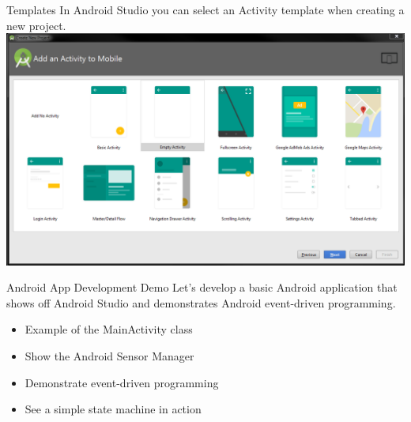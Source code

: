 \documentclass[aspectratio=169]{beamer}
\begin{document}
\begin{frame}{Templates}
In Android Studio you can select an Activity template when creating a new project. \\
\vspace{1em}
\centering
\includegraphics[height=0.85\textheight]{img/activityTemplates.png}

\end{frame}



\begin{frame}{Android App Development Demo}
\Large
Let's develop a basic Android application that shows off Android Studio and demonstrates Android event-driven programming.
\vspace{1em}
\begin{itemize}
	\item Example of the MainActivity class
	\item Show the Android Sensor Manager
	\item Demonstrate event-driven programming
	\item See a simple state machine in action
\end{itemize}
\end{frame}
\end{document}
